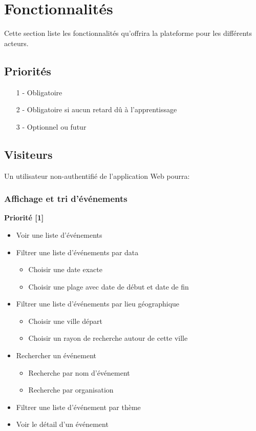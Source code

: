 \documentclass[11pt, a4paper, french, twoside]{article}
\begin{document}
	\section{Fonctionnalités}
	\label{sec:fonctionnalites}
		Cette section liste les fonctionnalités qu'offrira la plateforme pour les différents acteurs. 
		
		\subsection{Priorités}
		\label{subsec:priorites}
		
		\begin{itemize}
			\item [1] - Obligatoire
			\item [2] - Obligatoire si aucun retard dû à l'apprentissage
			\item [3] - Optionnel ou futur
		\end{itemize}
		
		\subsection{Visiteurs}
		\label{subsec:visiteurs}
			Un utilisateur non-authentifié de l'application Web pourra: 
			
			\subsubsection{Affichage et tri d'événements}
			\label{subsubsec:affichage_tri_evenements}
				
				\textbf{Priorité [1]}
			
				\begin{itemize}
					\item Voir une liste d'événements
					\item Filtrer une liste d'événements par data
						\begin{itemize}
							\item Choisir une date exacte
							\item Choisir une plage avec date de début et date de fin
						\end{itemize}
					\item Filtrer une liste d'événements par lieu géographique
						\begin{itemize}
							\item Choisir une ville départ
							\item Choisir un rayon de recherche autour de cette ville
						\end{itemize}
					\item Rechercher un événement
						\begin{itemize}
							\item Recherche par nom d'événement
							\item Recherche par organisation
						\end{itemize}
					\item Filtrer une liste d'événement par thème
					\item Voir le détail d'un événement
				\end{itemize}
			
\end{document}
